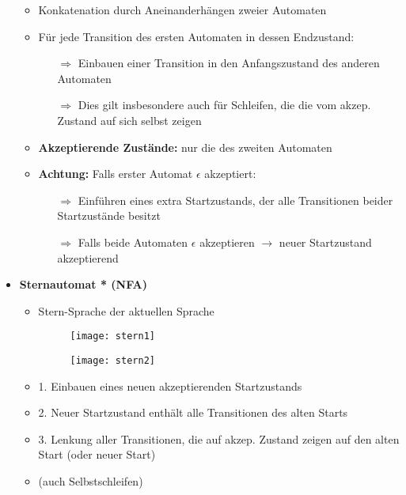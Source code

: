 \begin{itemize}
\begin{itemize}
	\item Konkatenation durch Aneinanderhängen zweier Automaten
	\item Für jede Transition des ersten Automaten in dessen Endzustand:
		\begin{itemize}
		\item[$\Rightarrow$] Einbauen einer Transition in den Anfangszustand des anderen Automaten
		\item[$\Rightarrow$] Dies gilt insbesondere auch für Schleifen, die die vom akzep. Zustand auf sich selbst zeigen
		\end{itemize}
	\item \textbf{Akzeptierende Zustände:} nur die des zweiten Automaten
	\item \textbf{Achtung:} Falls erster Automat $\epsilon$ akzeptiert:
		\begin{itemize}
		\item[$\Rightarrow$] Einführen eines extra Startzustands, der alle Transitionen beider Startzustände besitzt
		\item[$\Rightarrow$] Falls beide Automaten $\epsilon$ akzeptieren  $\rightarrow$ neuer Startzustand akzeptierend 
		\end{itemize}
		
	\end{itemize}
	
\pagebreak
	
\item {\large \textbf{Sternautomat * (NFA)}}
	\begin{itemize}
	
	\item Stern-Sprache der aktuellen Sprache	
	
	\item[]
		\begin{minipage}{0.45\textwidth}
				\begin{figure}[H]
				\texttt{[image: stern1]}
				\end{figure}
			\end{minipage}
			\begin{minipage}[t]{0.45\textwidth}
				\vspace{-1.75cm}
				\begin{figure}[H]
				\texttt{[image: stern2]}
				\end{figure}
			\end{minipage}
	
	\item 1. Einbauen eines neuen akzeptierenden Startzustands
	\item 2. Neuer Startzustand enthält alle Transitionen des alten Starts
	\item 3. Lenkung aller Transitionen, die auf akzep. Zustand zeigen auf den alten Start (oder neuer Start)
	\item (auch Selbstschleifen)
	

\end{itemize}
\end{itemize}
